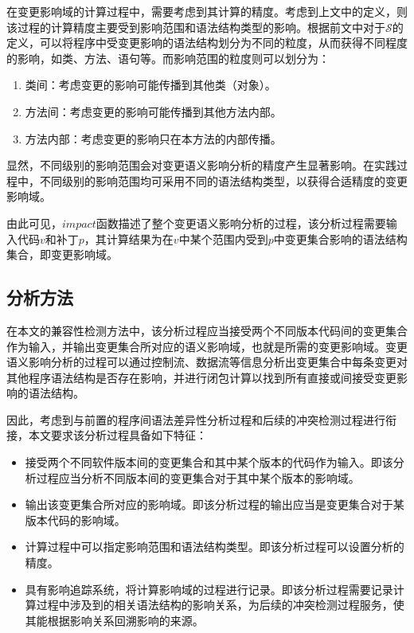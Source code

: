在变更影响域的计算过程中，需要考虑到其计算的精度。考虑到上文中的定义，则该过程的计算精度主要受到影响范围和语法结构类型的影响。根据前文中对于$\mathcal{S}$的定义，可以将程序中受变更影响的语法结构划分为不同的粒度，从而获得不同程度的影响\cite{petrenko2009variable}，如类、方法、语句等。而影响范围的粒度则可以划分为：
\begin{enumerate}
	\item 类间：考虑变更的影响可能传播到其他类（对象）。
	\item 方法间：考虑变更的影响可能传播到其他方法内部。
	\item 方法内部：考虑变更的影响只在本方法的内部传播。
\end{enumerate}

显然，不同级别的影响范围会对变更语义影响分析的精度产生显著影响。在实践过程中，不同级别的影响范围均可采用不同的语法结构类型，以获得合适精度的变更影响域。

由此可见，$impact$函数描述了整个变更语义影响分析的过程，该分析过程需要输入代码$v$和补丁$p$，其计算结果为在$v$中某个范围内受到$p$中变更集合影响的语法结构集合，即变更影响域。

\subsection{分析方法}

在本文的兼容性检测方法中，该分析过程应当接受两个不同版本代码间的变更集合作为输入，并输出变更集合所对应的语义影响域，也就是所需的变更影响域。变更语义影响分析的过程可以通过控制流、数据流等信息分析出变更集合中每条变更对其他程序语法结构是否存在影响，并进行闭包计算以找到所有直接或间接受变更影响的语法结构。

因此，考虑到与前置的程序间语法差异性分析过程和后续的冲突检测过程进行衔接，本文要求该分析过程具备如下特征：
\begin{itemize}
	\item 接受两个不同软件版本间的变更集合和其中某个版本的代码作为输入。即该分析过程应当分析不同版本间的变更集合对于其中某个版本的影响域。
	\item 输出该变更集合所对应的影响域。即该分析过程的输出应当是变更集合对于某版本代码的影响域。
	\item 计算过程中可以指定影响范围和语法结构类型。即该分析过程可以设置分析的精度。
	\item 具有影响追踪系统，将计算影响域的过程进行记录。即该分析过程需要记录计算过程中涉及到的相关语法结构的影响关系，为后续的冲突检测过程服务，使其能根据影响关系回溯影响的来源。
\end{itemize}

